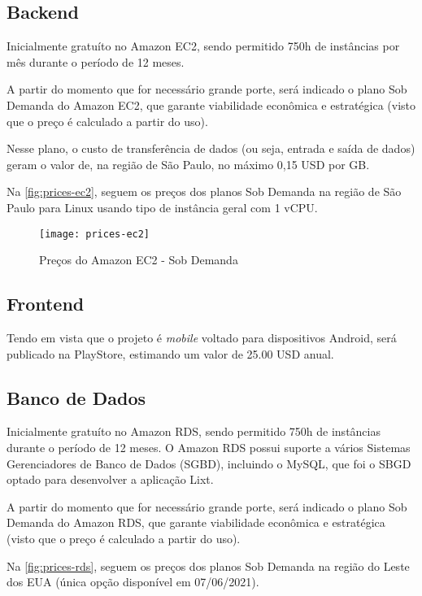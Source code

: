 \subsection{Backend}

Inicialmente gratuíto no Amazon EC2, sendo permitido 750h de instâncias por mês durante o período de 12 meses.

A partir do momento que for necessário grande porte, será indicado o plano Sob Demanda do Amazon EC2, que garante viabilidade econômica e estratégica (visto que o preço é calculado a partir do uso). 

Nesse plano, o custo de transferência de dados (ou seja, entrada e saída de dados) geram o valor de, na região de São Paulo, no máximo 0,15 USD por GB.

Na \autoref{fig:prices-ec2}, seguem os preços dos planos Sob Demanda na região de São Paulo para Linux usando tipo de instância geral com 1 vCPU.

\begin{figure}[h]
  \centering
  \texttt{[image: prices-ec2]}
  \caption{Preços do Amazon EC2 - Sob Demanda}
  \label{fig:prices-ec2}
\end{figure}

\subsection{Frontend} 

Tendo em vista que o projeto é \textit{mobile} voltado para dispositivos Android, será publicado na PlayStore, estimando um valor de 25.00 USD anual. 

\subsection{Banco de Dados} 

Inicialmente gratuíto no Amazon RDS, sendo permitido 750h de instâncias durante o período de 12 meses. O Amazon RDS possui suporte a vários Sistemas Gerenciadores de Banco de Dados (SGBD), incluindo o MySQL, que foi o SBGD optado para desenvolver a aplicação Lixt.

A partir do momento que for necessário grande porte, será indicado o plano Sob Demanda do Amazon RDS, que garante viabilidade econômica e estratégica (visto que o preço é calculado a partir do uso).

Na \autoref{fig:prices-rds}, seguem os preços dos planos Sob Demanda na região do Leste dos EUA (única opção disponível em 07/06/2021).

